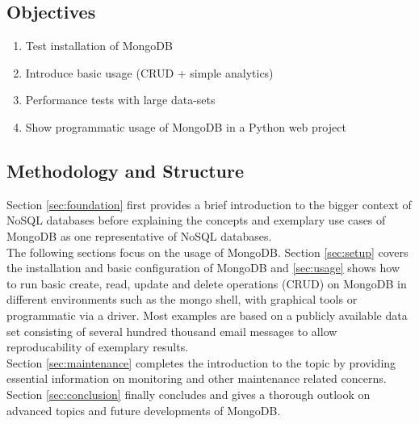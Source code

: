 

\subsection{Objectives}
\label{sec:objectives}

\begin{enumerate}
  \item Test installation of MongoDB
  \item Introduce basic usage (CRUD + simple analytics)
  \item Performance tests with large data-sets
  \item Show programmatic usage of MongoDB in a Python web project
\end{enumerate}

\subsection{Methodology and Structure}
\label{sec:methodology}

Section \ref{sec:foundation} first provides a brief introduction to the bigger
context of NoSQL databases before explaining the concepts and exemplary use
cases of MongoDB as one representative of NoSQL databases.\\
The following sections focus on the usage of MongoDB. Section \ref{sec:setup}
covers the installation and basic configuration of MongoDB and
\autoref{sec:usage} shows how to run basic create, read, update and delete
operations (CRUD) on MongoDB in different environments such as the mongo shell,
with graphical tools or programmatic via a driver.
Most examples are based on a publicly available data set consisting of several
hundred thousand email messages to allow reproducability of exemplary
results.\\
Section \ref{sec:maintenance} completes the introduction to the topic by
providing essential information on monitoring and other maintenance related
concerns. Section \ref{sec:conclusion} finally concludes and gives a thorough
outlook on advanced topics and future developments of MongoDB.


\newpage

